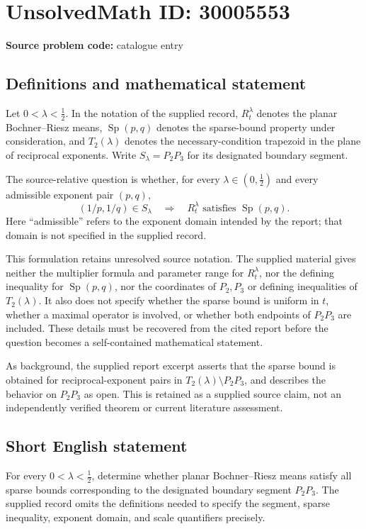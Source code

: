 \documentclass[11pt]{article}
\begin{document}
\section*{UnsolvedMath ID: 30005553}
\textbf{Source problem code:} catalogue entry
\subsection{Definitions and mathematical statement}
Let \(0<\lambda<\tfrac12\). In the notation of the supplied record, \(R_t^\lambda\) denotes the planar Bochner--Riesz means, \(\operatorname{Sp}(p,q)\) denotes the sparse-bound property under consideration, and \(T_2(\lambda)\) denotes the necessary-condition trapezoid in the plane of reciprocal exponents. Write \(S_\lambda=P_2P_3\) for its designated boundary segment.

The source-relative question is whether, for every \(\lambda\in(0,\tfrac12)\) and every admissible exponent pair \((p,q)\),
\[
  (1/p,1/q)\in S_\lambda
  \quad\Longrightarrow\quad
  R_t^\lambda\text{ satisfies }\operatorname{Sp}(p,q).
\]
Here ``admissible'' refers to the exponent domain intended by the report; that domain is not specified in the supplied record.

This formulation retains unresolved source notation. The supplied material gives neither the multiplier formula and parameter range for \(R_t^\lambda\), nor the defining inequality for \(\operatorname{Sp}(p,q)\), nor the coordinates of \(P_2,P_3\) or defining inequalities of \(T_2(\lambda)\). It also does not specify whether the sparse bound is uniform in \(t\), whether a maximal operator is involved, or whether both endpoints of \(P_2P_3\) are included. These details must be recovered from the cited report before the question becomes a self-contained mathematical statement.

As background, the supplied report excerpt asserts that the sparse bound is obtained for reciprocal-exponent pairs in \(T_2(\lambda)\setminus P_2P_3\), and describes the behavior on \(P_2P_3\) as open. This is retained as a supplied source claim, not an independently verified theorem or current literature assessment.
\subsection{Short English statement}
For every \(0<\lambda<\tfrac12\), determine whether planar Bochner--Riesz means satisfy all sparse bounds corresponding to the designated boundary segment \(P_2P_3\). The supplied record omits the definitions needed to specify the segment, sparse inequality, exponent domain, and scale quantifiers precisely.
\end{document}
